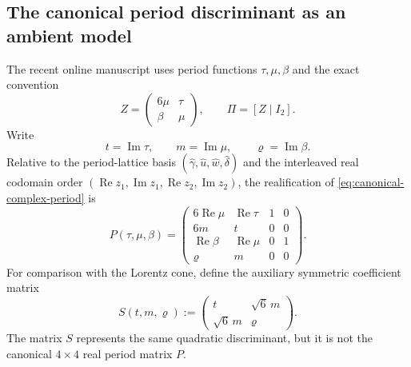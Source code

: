 \documentclass[11pt]{article}
\numberwithin{equation}{section}
\theoremstyle{definition}
\theoremstyle{remark}
\begin{document}
\subsection{The canonical period discriminant as an ambient model}

The recent online manuscript \citet{AlpogeS6_2026} uses period functions
$\tau,\mu,\beta$ and the exact convention
\begin{equation}\label{eq:canonical-complex-period}
 Z=\begin{pmatrix}6\mu&\tau\\ \beta&\mu\end{pmatrix},
 \qquad \Pi=[Z\mid I_2].
\end{equation}
Write
\[
 t=\operatorname{Im}\tau,\qquad
 m=\operatorname{Im}\mu,\qquad
 \varrho=\operatorname{Im}\beta.
\]
Relative to the period-lattice basis
$(\widehat\gamma,\widehat u,\widehat w,\widehat\delta)$ and the interleaved
real codomain order
$(\operatorname{Re}z_1,\operatorname{Im}z_1,
  \operatorname{Re}z_2,\operatorname{Im}z_2)$,
the realification of \eqref{eq:canonical-complex-period} is
\begin{equation}\label{eq:canonical-real-period}
 P(\tau,\mu,\beta)=
 \begin{pmatrix}
  6\operatorname{Re}\mu&\operatorname{Re}\tau&1&0\\
  6m&t&0&0\\
  \operatorname{Re}\beta&\operatorname{Re}\mu&0&1\\
  \varrho&m&0&0
 \end{pmatrix}.
\end{equation}
For comparison with the Lorentz cone, define the auxiliary symmetric
coefficient matrix
\begin{equation}\label{eq:symmetric-coefficient-matrix}
 S(t,m,\varrho)
 :=\begin{pmatrix}t&\sqrt6\,m\\ \sqrt6\,m&\varrho\end{pmatrix}.
\end{equation}
The matrix $S$ represents the same quadratic discriminant, but it is not the
canonical $4\times4$ real period matrix $P$.
\end{document}
